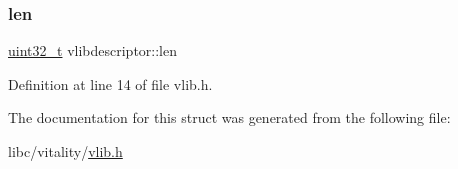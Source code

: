 \subsubsection{\texorpdfstring{len}{len}}
{\footnotesize\ttfamily \hyperlink{a00125_a435d1572bf3f880d55459d9805097f62_a435d1572bf3f880d55459d9805097f62}{uint32\+\_\+t} vlibdescriptor\+::len}



Definition at line 14 of file vlib.\+h.



The documentation for this struct was generated from the following file\+:\begin{DoxyCompactItemize}
\item 
libc/vitality/\hyperlink{a00170}{vlib.\+h}\end{DoxyCompactItemize}
